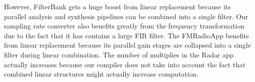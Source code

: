 However, FilterBank gets a huge boost from linear replacement because its
parallel analysis and synthesis pipelines can be combined into a single filter.
Our sampling rate converter also benefits greatly from the frequency transformation
due to the fact that it has contains a large FIR filter. The FMRadioApp
benefits from linear replacement because its parallel gain stages are collapsed
into a single filter during linear combination. The number of multiplies in the
Radar app actually increases because our compiler does not take into account the
fact that combined linear structures might actually increase computation.
